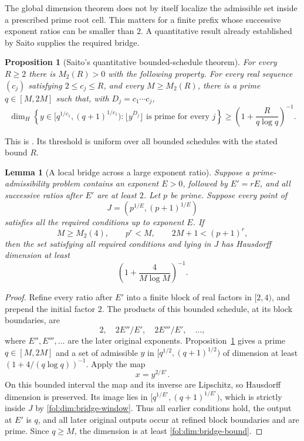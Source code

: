 \documentclass[11pt,a4paper]{article}
\newtheorem{lemma}[theorem]{Lemma}
\newtheorem{proposition}[theorem]{Proposition}
\theoremstyle{definition}
\theoremstyle{remark}
\numberwithin{equation}{section}
\begin{document}
The global dimension theorem does not by itself localize the admissible set
inside a prescribed prime root cell.  This matters for a finite prefix whose
successive exponent ratios can be smaller than $2$.  A quantitative result
already established by Saito supplies the required bridge.

\begin{proposition}[Saito's quantitative bounded-schedule theorem]
\label{fol:dim:saito-local}
For every $R\ge2$ there is $M_2(R)>0$ with the following property.  For every
real sequence $(c_j)$ satisfying $2\le c_j\le R$, and every $M\ge M_2(R)$,
there is a prime $q\in[M,2M]$ such that, with $D_j=c_1\cdots c_j$,
\[
 \dim_H\left\{y\in[q^{1/c_1},(q+1)^{1/c_1}):
       \lfloor y^{D_j}\rfloor\text{ is prime for every }j\right\}
 \ge \left(1+\frac{R}{q\log q}\right)^{-1}.
\]
\end{proposition}
This is \cite[Theorem~6.1]{SaitoDimension2021}.  Its threshold is uniform
over all bounded schedules with the stated bound $R$.

\begin{lemma}[A local bridge across a large exponent ratio]
\label{fol:dim:bridge}
Suppose a prime-admissibility problem contains an exponent $E>0$, followed
by $E'=rE$, and all successive ratios after $E'$ are at least $2$.  Let $p$
be prime.  Suppose every point of
\[
 J=(p^{1/E},(p+1)^{1/E})
\]
satisfies all the required conditions up to exponent $E$.  If
\begin{equation}\label{fol:dim:bridge-window}
 M\ge M_2(4),\qquad p^r<M,\qquad 2M+1<(p+1)^r,
\end{equation}
then the set satisfying all required conditions and lying in $J$ has
Hausdorff dimension at least
\begin{equation}\label{fol:dim:bridge-bound}
 \left(1+\frac{4}{M\log M}\right)^{-1}.
\end{equation}
\end{lemma}
\begin{proof}
Refine every ratio after $E'$ into a finite block of real factors in
$[2,4)$, and prepend the initial factor $2$.  The products of this bounded
schedule, at its block boundaries, are
\[
 2,\quad 2E''/E',\quad 2E'''/E',\quad\ldots,
\]
where $E'',E''',\ldots$ are the later original exponents.
Proposition~\ref{fol:dim:saito-local} gives a prime $q\in[M,2M]$ and a set of
admissible $y$ in $[q^{1/2},(q+1)^{1/2})$ of dimension at least
$(1+4/(q\log q))^{-1}$.  Apply the map
\[
 x=y^{2/E'}.
\]
On this bounded interval the map and its inverse are Lipschitz, so
Hausdorff dimension is preserved.  Its image lies in
$[q^{1/E'},(q+1)^{1/E'})$, which is strictly inside $J$ by
\eqref{fol:dim:bridge-window}.  Thus all earlier conditions hold, the output
at $E'$ is $q$, and all later original outputs occur at refined block
boundaries and are prime.  Since $q\ge M$, the dimension is at least
\eqref{fol:dim:bridge-bound}.
\end{proof}
\end{document}
